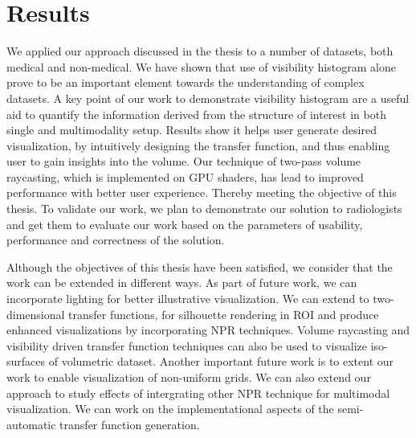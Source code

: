 
\chapter{Results}\label{chap:}

We applied our approach discussed in the thesis to a number of datasets, both medical and non-medical. We have shown that use of visibility histogram alone prove to be an important element towards the understanding of complex datasets. A key point of our work to demonstrate visibility histogram are a useful aid to quantify the information derived from the structure of interest in both single and multimodality setup. Results show it helps user generate desired visualization, by intuitively designing the transfer function, and thus enabling user to gain insights into the volume. Our technique of two-pass volume raycasting, which is implemented on GPU shaders, has lead to improved performance with better user experience. Thereby meeting the objective of this thesis. To validate our work, we plan to demonstrate our solution to radiologists and get them to evaluate our work based on the parameters of usability, performance and correctness of the solution.   

Although the objectives of this thesis have been satisfied, we consider that the work can be extended in different ways. As part of future work, we can incorporate lighting for better illustrative visualization. We can extend to two-dimensional transfer functions, for silhouette rendering in ROI and produce enhanced visualizations by incorporating NPR techniques. Volume raycasting and visibility driven transfer function techniques can also be used to visualize iso-surfaces of volumetric dataset. Another important future work is to extent our work to enable visualization of non-uniform grids. We can also extend our approach to study effects of intergrating other NPR technique for multimodal visualization. We can work on the implementational aspects of the semi-automatic transfer function generation.


 


